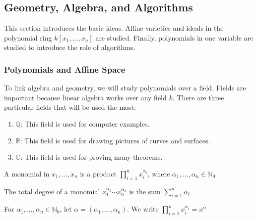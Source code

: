        \subsection{Geometry, Algebra, and Algorithms}
            This section introduces the basic ideas. Affine
            varieties and ideals in the polynomial ring
            $k[x_1,\hdots,x_n]$ are studied. Finally, polynomials
            in one variable are studied to introduce the role
            of algorithms.
            \subsubsection{Polynomials and Affine Space}
                To link algebra and geometry, we will study
                polynomials over a field. Fields are important
                because linear algebra works over any field $k$.
                There are three particular fields that will
                be used the most:
                \begin{enumerate}
                    \item $\mathbb{Q}$: This field is used
                          for computer examples.
                    \item $\mathbb{R}$: This field is used
                          for drawing pictures of curves and surfaces.
                    \item $\mathbb{C}$: This field is used
                          for proving many theorems.
                \end{enumerate}
                \begin{definition}
                    A monomial in $x_1,\hdots,x_n$ is a product
                    $\prod_{i=1}^{n}x_{i}^{\alpha_{i}}$, where
                    $\alpha_{1},\hdots,\alpha_{n}\in\mathbb{N}_0$
                \end{definition}
                \begin{definition}
                    The total degree of a monomial
                    $x_1^{\alpha_1}\cdots x_n^{\alpha_n}$ is
                    the sum $\sum_{i=1}^{n}\alpha_{i}$
                \end{definition}
                \begin{notation}
                    For $\alpha_1,\hdots,\alpha_n\in\mathbb{N}_0$,
                    let $\alpha=(\alpha_1,\hdots,\alpha_n)$.
                    We write
                    $\prod_{i=1}^{n}x_{i}^{\alpha_{i}}=x^{\alpha}$
                \end{notation}
